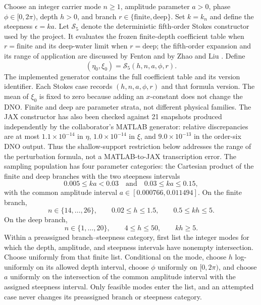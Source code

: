 \documentclass[11pt]{article}
\begin{document}
Choose an integer carrier mode $n\geq1$, amplitude parameter $a>0$, phase
$\phi\in[0,2\pi)$, depth $h>0$, and branch
$r\in\{\mathrm{finite},\mathrm{deep}\}$.  Set $k=k_n$ and define the
steepness $\epsilon=ka$.  Let $\mathcal S_5$ denote the deterministic
fifth-order Stokes constructor used by the project.  It evaluates the frozen
finite-depth coefficient table when $r=\mathrm{finite}$ and its deep-water
limit when $r=\mathrm{deep}$; the fifth-order expansion and its range of
application are discussed by Fenton and by Zhao and Liu
\cite{fenton1985,zhao2022}.  Define
\begin{equation}
  (\eta_0,\xi_0)=\mathcal S_5(h,n,a,\phi,r).
  \label{eq:stokes-harmonic-form}
\end{equation}
The implemented generator contains the full coefficient table and its
version identifier.  Each Stokes case records $(h,n,a,\phi,r)$ and that
formula version.  The mean of $\xi_0$ is fixed to zero because adding an
$x$-constant does not change the DNO.  Finite and deep are parameter strata,
not different physical families.  The JAX constructor has also been checked
against 21 snapshots produced independently by the collaborator's MATLAB
generator: relative discrepancies are at most $1.1\times10^{-14}$ in
$\eta$, $1.0\times10^{-14}$ in $\xi$, and $9.0\times10^{-13}$ in the
order-six DNO output.  Thus the shallow-support restriction below addresses
the range of the perturbation formula, not a MATLAB-to-JAX transcription
error.  The sampling population has four parameter categories: the Cartesian
product of the finite and deep branches with the two steepness intervals
\begin{equation}
  0.005\leq ka<0.03
  \quad\text{and}\quad
  0.03\leq ka\leq0.15,
  \label{eq:stokes-steepness-strata}
\end{equation}
with the common amplitude interval
$a\in[0.000766,0.011494]$.  On the finite branch,
\[
  n\in\{14,\ldots,26\},\qquad 0.02\leq h\leq1.5,\qquad
  0.5\leq kh\leq5.
\]
On the deep branch,
\[
  n\in\{1,\ldots,20\},\qquad 4\leq h\leq50,\qquad kh\geq5.
\]
Within a preassigned branch--steepness category, first list the integer modes for
which the depth, amplitude, and steepness intervals have nonempty
intersection.  Choose uniformly from that finite list.  Conditional on the
mode, choose $h$ log-uniformly on its allowed depth interval, choose
$\phi$ uniformly on $[0,2\pi)$, and choose $a$ uniformly on the intersection
of the common amplitude interval with the assigned steepness interval.
Only feasible modes enter the list, and an attempted case never changes its
preassigned branch or steepness category.
\end{document}
